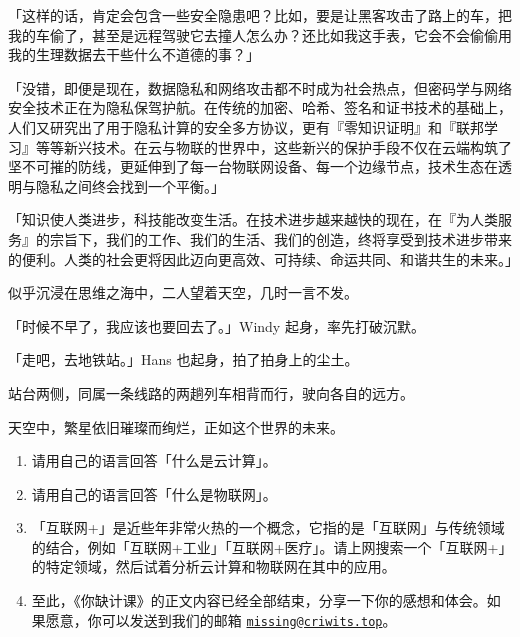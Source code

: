 「这样的话，肯定会包含一些安全隐患吧？比如，要是让黑客攻击了路上的车，把我的车偷了，甚至是远程驾驶它去撞人怎么办？还比如我这手表，它会不会偷偷用我的生理数据去干些什么不道德的事？」

「没错，即便是现在，数据隐私和网络攻击都不时成为社会热点，但密码学与网络安全技术正在为隐私保驾护航。在传统的加密、哈希、签名和证书技术的基础上，人们又研究出了用于隐私计算的安全多方协议，更有『零知识证明』和『联邦学习』等等新兴技术。在云与物联的世界中，这些新兴的保护手段不仅在云端构筑了坚不可摧的防线，更延伸到了每一台物联网设备、每一个边缘节点，技术生态在透明与隐私之间终会找到一个平衡。」

「知识使人类进步，科技能改变生活。在技术进步越来越快的现在，在『为人类服务』的宗旨下，我们的工作、我们的生活、我们的创造，终将享受到技术进步带来的便利。人类的社会更将因此迈向更高效、可持续、命运共同、和谐共生的未来。」

似乎沉浸在思维之海中，二人望着天空，几时一言不发。

「时候不早了，我应该也要回去了。」Windy 起身，率先打破沉默。

「走吧，去地铁站。」Hans 也起身，拍了拍身上的尘土。

站台两侧，同属一条线路的两趟列车相背而行，驶向各自的远方。

天空中，繁星依旧璀璨而绚烂，正如这个世界的未来。

\practice

\begin{enumerate}
  \item 请用自己的语言回答「什么是云计算」。
  \item 请用自己的语言回答「什么是物联网」。
  \item 「互联网+」是近些年非常火热的一个概念，它指的是「互联网」与传统领域的结合，例如「互联网+工业」「互联网+医疗」。请上网搜索一个「互联网+」的特定领域，然后试着分析云计算和物联网在其中的应用。
  \item 至此，《你缺计课》的正文内容已经全部结束，分享一下你的感想和体会。如果愿意，你可以发送到我们的邮箱 \href{mailto:missing@criwits.top}{\texttt{missing@criwits.top}}。
\end{enumerate}